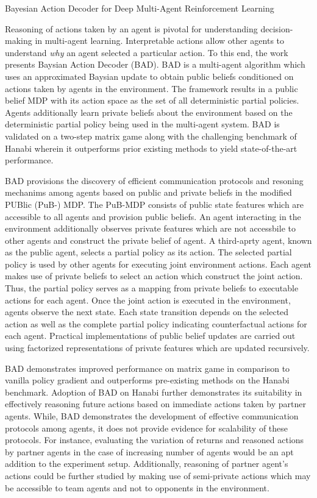 \documentclass[11pt,letterpaper]{article}
\begin{document}
\begin{center}
  \large{Bayesian Action Decoder for Deep Multi-Agent Reinforcement Learning}
\end{center}

Reasoning of actions taken by an agent is pivotal for understanding decision-making in multi-agent learning. Interpretable actions allow other agents to understand \textit{why} an agent selected a particular action. To this end, the work presents Baysian Action Decoder (BAD). BAD is a multi-agent algorithm which uses an approximated Baysian update to obtain public beliefs conditioned on actions taken by agents in the environment. The framework results in a public belief MDP with its action space as the set of all deterministic partial policies. Agents additionally learn private beliefs about the environment based on the deterministic partial policy being used in the multi-agent system. BAD is validated on a two-step matrix game along with the challenging benchmark of Hanabi wherein it outperforms prior existing methods to yield state-of-the-art performance. 

BAD provisions the discovery of efficient communication protocols and resoning mechanims among agents based on public and private beliefs in the modified PUBlic (PuB-) MDP. The PuB-MDP consists of public state features which are accessible to all agents and provision public beliefs. An agent interacting in the environment additionally observes private features which are not accessbile to other agents and construct the private belief of agent. A third-aprty agent, known as the public agent, selects a partial policy as its action. The selected partial policy is used by other agents for executing joint environment actions. Each agent makes use of private beliefs to select an action which construct the joint action. Thus, the partial policy serves as a mapping from private beliefs to executable actions for each agent. Once the joint action is executed in the environment, agents observe the next state. Each state transition depends on the selected action as well as the complete partial policy indicating counterfactual actions for each agent. Practical implementations of public belief updates are carried out using factorized representations of private features which are updated recursively. 

BAD demonstrates improved performance on matrix game in comparison to vanilla policy gradient and outperforms pre-existing methods on the Hanabi benchmark. Adoption of BAD on Hanabi further demonstrates its suitability in effectively reasoning future actions based on immediate actions taken by partner agents. While, BAD demonstrates the development of effective communication protocols among agents, it does not provide evidence for scalability of these protocols. For instance, evaluating the variation of returns and reasoned actions by partner agents in the case of increasing number of agents would be an apt addition to the experiment setup. Additionally, reasoning of partner agent's actions could be further studied by making use of semi-private actions which may be accessible to team agents and not to opponents in the environment. 
\end{document}
